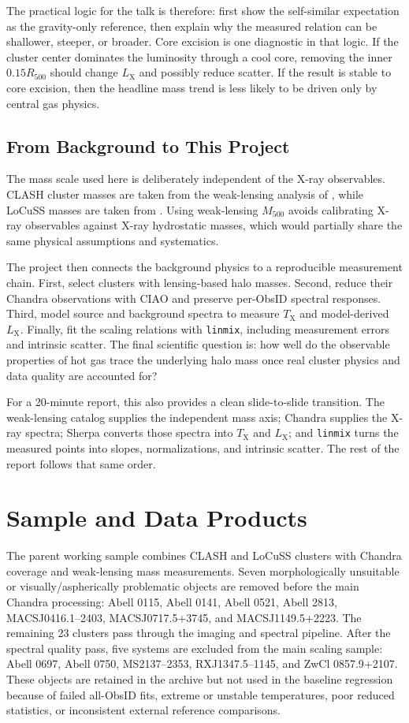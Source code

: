 \documentclass[11pt]{article}
\newcommand{\Mfive}{\ensuremath{M_{500}}}
\newcommand{\Rfive}{\ensuremath{R_{500}}}
\newcommand{\Lx}{\ensuremath{L_{\mathrm{X}}}}
\newcommand{\Tx}{\ensuremath{T_{\mathrm{X}}}}
\begin{document}
The practical logic for the talk is therefore: first show the self-similar expectation as the gravity-only reference, then explain why the measured relation can be shallower, steeper, or broader. Core excision is one diagnostic in that logic. If the cluster center dominates the luminosity through a cool core, removing the inner $0.15\Rfive$ should change \Lx{} and possibly reduce scatter. If the result is stable to core excision, then the headline mass trend is less likely to be driven only by central gas physics.

\subsection{From Background to This Project}

The mass scale used here is deliberately independent of the X-ray observables. CLASH cluster masses are taken from the weak-lensing analysis of \citet{umetsu2016}, while LoCuSS masses are taken from \citet{okabe2016}. Using weak-lensing \Mfive{} avoids calibrating X-ray observables against X-ray hydrostatic masses, which would partially share the same physical assumptions and systematics.

The project then connects the background physics to a reproducible measurement chain. First, select clusters with lensing-based halo masses. Second, reduce their Chandra observations with CIAO and preserve per-ObsID spectral responses. Third, model source and background spectra to measure \Tx{} and model-derived \Lx{}. Finally, fit the scaling relations with \texttt{linmix}, including measurement errors and intrinsic scatter. The final scientific question is: how well do the observable properties of hot gas trace the underlying halo mass once real cluster physics and data quality are accounted for?

For a 20-minute report, this also provides a clean slide-to-slide transition. The weak-lensing catalog supplies the independent mass axis; Chandra supplies the X-ray spectra; Sherpa converts those spectra into \Tx{} and \Lx{}; and \texttt{linmix} turns the measured points into slopes, normalizations, and intrinsic scatter. The rest of the report follows that same order.

\section{Sample and Data Products}

The parent working sample combines CLASH and LoCuSS clusters with Chandra coverage and weak-lensing mass measurements. Seven morphologically unsuitable or visually/aspherically problematic objects are removed before the main Chandra processing: Abell 0115, Abell 0141, Abell 0521, Abell 2813, MACSJ0416.1--2403, MACSJ0717.5+3745, and MACSJ1149.5+2223. The remaining 23 clusters pass through the imaging and spectral pipeline. After the spectral quality pass, five systems are excluded from the main scaling sample: Abell 0697, Abell 0750, MS2137--2353, RXJ1347.5--1145, and ZwCl 0857.9+2107. These objects are retained in the archive but not used in the baseline regression because of failed all-ObsID fits, extreme or unstable temperatures, poor reduced statistics, or inconsistent external reference comparisons.
\end{document}
